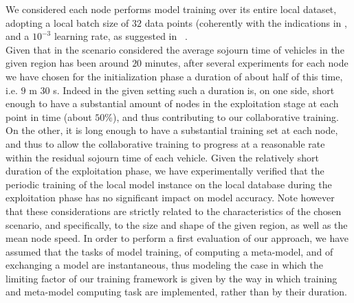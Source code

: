 We considered each node performs model training over its entire local dataset, adopting a local batch size of $32$ data points (coherently with the indications in \cite{bengio2012practical} \cite{masters2018revisiting}, and a $10^{-3}$ learning rate, as suggested in ~\cite{geron2019hands}.\\
Given that in the scenario considered the average sojourn time of vehicles in the given region has been around $20$ minutes, after several experiments for each node we have chosen for the initialization phase a duration of about half of this time, i.e. $9$ m $30$ s. Indeed in the given setting such a duration is, on one side, short enough to have a substantial amount of nodes in the exploitation stage at each point in time (about $50\%$), and thus contributing to our collaborative training. On the other, it is long enough to have a substantial training set at each node, and thus to allow the collaborative training to progress at a reasonable rate within the residual sojourn time of each vehicle. Given the relatively short duration of the exploitation phase, we have experimentally verified that the periodic training of the local model instance on the local database during the exploitation phase has no significant impact on model accuracy. Note however that these considerations are strictly related to the characteristics of the chosen scenario, and specifically, to the size and shape of the given region, as well as the mean node speed. In order to perform a first evaluation of our approach, we have assumed that the tasks of model training, of computing a meta-model, and of exchanging a model are instantaneous, thus modeling the case in which the limiting factor of our training framework is given by the way in which training and meta-model computing task are implemented, rather than by their duration.\\       
